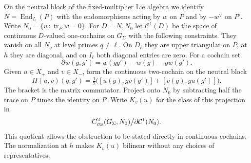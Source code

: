 \documentclass[a4paper,11pt]{article}
\theoremstyle{definition}
\theoremstyle{remark}
\numberwithin{equation}{section}
\begin{document}
On the neutral block of the fixed-multiplier Lie algebra we
identify \(N=\operatorname{End}_L(P)\) with the endomorphisms
acting by \(w\) on \(P\) and by \(-w^\vee\) on \(P'\).
Write \(N_0=\{w:\operatorname{tr}_P w=0\}\). For \(D=N,N_0\)
let \(\mathcal C^1(D)\) be the space of continuous \(D\)-valued
one-cochains on \(G_\Sigma\) with the following constraints.
They vanish on all \(N_q\) at level primes \(q\ne\ell\).
On \(D_\ell\) they are upper triangular on \(P\), at \(h\)
they are diagonal, and on \(I_\ell\) both diagonal entries are
zero. For a cochain set
\[
     \partial w(g,g')=w(gg')-w(g)-g w(g').
\]
Given \(u\in X_+\) and \(v\in X_-\), form the continuous
two-cochain on the neutral block
\[
     H(u,v)(g,g')=\tfrac12\bigl([u(g),g v(g')]
                                   +[v(g),g u(g')]\bigr).
\]
The bracket is the matrix commutator. Project onto \(N_0\)
by subtracting half the trace on \(P\) times the identity on
\(P\). Write \(K_v(u)\) for the class of this projection in
\[
    C^2_{\rm cts}(G_\Sigma,N_0)\big/\partial\mathcal C^1(N_0).
\]
This quotient allows the obstruction to be stated directly
in continuous cochains. The normalization at \(h\) makes
\(K_v(u)\) bilinear without any choices of representatives.
\end{document}
